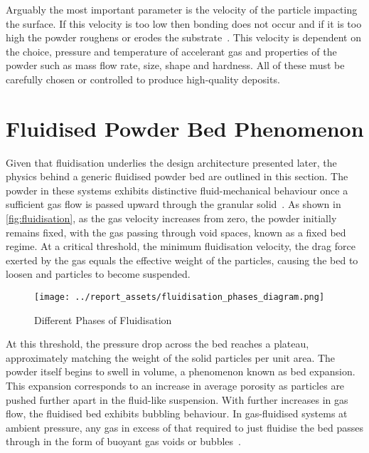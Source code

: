 Arguably the most important parameter is the velocity of the particle impacting the surface. If this velocity is too low then bonding does not occur and if it is too high the powder roughens or erodes the substrate~\cite{Guo2022}. This velocity is dependent on the choice, pressure and temperature of accelerant gas and properties of the powder such as mass flow rate, size, shape and hardness. All of these must be carefully chosen or controlled to produce high-quality deposits.


\section{Fluidised Powder Bed Phenomenon}\label{sec:background-powder-beds}
Given that fluidisation underlies the design architecture presented later, the physics behind a generic fluidised powder bed are outlined in this section. The powder in these systems exhibits distinctive fluid-mechanical behaviour once a sufficient gas flow is passed upward through the granular solid~\cite{KuniiLevenspiel1977}. As shown in \autoref{fig:fluidisation}, as the gas velocity increases from zero, the powder initially remains fixed, with the gas passing through void spaces, known as a fixed bed regime. At a critical threshold, the minimum fluidisation velocity, the drag force exerted by the gas equals the effective weight of the particles, causing the bed to loosen and particles to become suspended.
\begin{figure}[htbp]
    \centering
    
    \begin{minipage}{0.45\textwidth}
        \centering
        \texttt{[image: ../report\_assets/fluidisation\_phases\_diagram.png]}
        \caption{Different Phases of Fluidisation~\cite{klaren2021fluidization}}
    \end{minipage}
    
\end{figure}\label{fig:fluidisation}
At this threshold, the pressure drop across the bed reaches a plateau, approximately matching the weight of the solid particles per unit area. The powder itself begins to swell in volume, a phenomenon known as bed expansion. This expansion corresponds to an increase in average porosity as particles are pushed further apart in the fluid-like suspension. With further increases in gas flow, the fluidised bed exhibits bubbling behaviour. In gas-fluidised systems at ambient pressure, any gas in excess of that required to just fluidise the bed passes through in the form of buoyant gas voids or bubbles~\cite{SHENG2022137168}.

